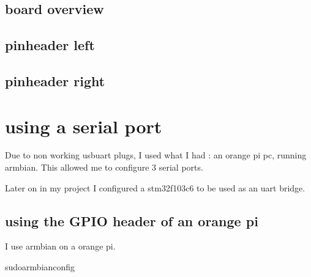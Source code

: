 \documentclass[letterpaper,10pt,english]{sphinxmanual}
\begin{document}
\begin{sphinxVerbatim}[commandchars=\\\{\}]

\end{sphinxVerbatim}


\subsection{board overview}
\label{\detokenize{stm/stm32f429i:board-overview}}
\noindent{}


\subsection{pinheader left}
\label{\detokenize{stm/stm32f429i:pinheader-left}}
\noindent{}


\subsection{pinheader right}
\label{\detokenize{stm/stm32f429i:pinheader-right}}
\noindent{}


\section{using a serial port}
\label{\detokenize{stm/serial:using-a-serial-port}}\label{\detokenize{stm/serial::doc}}
\sphinxAtStartPar
Due to non working usb\sphinxhyphen{}uart plugs, I used what I had : an orange pi pc, running armbian. This allowed me to configure 3 serial ports.

\sphinxAtStartPar
Later on in my project I configured a stm32f103c6 to be used as an uart bridge.


\subsection{using the GPIO header of an orange pi}
\label{\detokenize{stm/serial:using-the-gpio-header-of-an-orange-pi}}
\noindent{}

\sphinxAtStartPar
I use armbian on a orange pi.

\begin{sphinxVerbatim}[commandchars=\\\{\}]
sudoarmbian\PYGZhy{}config
\end{sphinxVerbatim}
\end{document}
